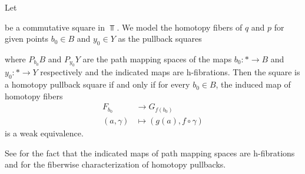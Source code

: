 \begin{prop}\label{prop:fiberwiseCharOfHtpyPb}
    Let 
    \begin{center}
    \end{center}
    be a commutative square in $\Top$. 
    We model the homotopy fibers of $q$ and $p$ for given points $b_0\in B$ and $y_0\in Y$ as the pullback squares
    \begin{center} 
    \end{center}
    where $P_{b_0}B$ and $P_{y_0}Y$ are the path mapping spaces of the maps $b_0\colon *\to B$ and  $y_0\colon *\to Y$ respectively and the indicated maps are h-fibrations. 
    Then the square is a homotopy pullback square if and only if for every $b_0\in B$, the induced map of homotopy fibers
    \begin{align*}
        F_{b_0}&\to G_{f(b_0)} \\
        (a,\gamma)&\mapsto(g(a),f\circ\gamma)
    \end{align*}
    is a weak equivalence.
    \begin{reference}
        See \cite[Proposition 2.2.2]{cubical_htpy_theory} for the fact that the indicated maps of path mapping spaces are h-fibrations and \cite[Proposition 3.3.18]{cubical_htpy_theory} for the fiberwise characterization of homotopy pullbacks.
    \end{reference}
\end{prop}
